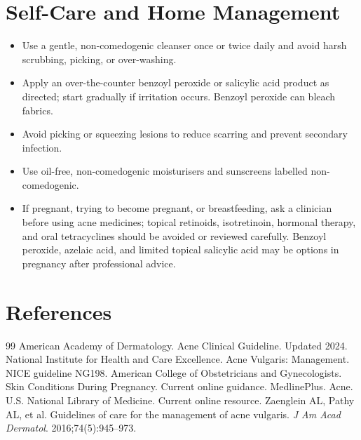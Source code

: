 \section*{Self-Care and Home Management}
\begin{itemize}
 \item Use a gentle, non-comedogenic cleanser once or twice daily and avoid harsh scrubbing, picking, or over-washing.
 \item Apply an over-the-counter benzoyl peroxide or salicylic acid product as directed; start gradually if irritation occurs. Benzoyl peroxide can bleach fabrics.
 \item Avoid picking or squeezing lesions to reduce scarring and prevent secondary infection.
 \item Use oil-free, non-comedogenic moisturisers and sunscreens labelled non-comedogenic.
 \item If pregnant, trying to become pregnant, or breastfeeding, ask a clinician before using acne medicines; topical retinoids, isotretinoin, hormonal therapy, and oral tetracyclines should be avoided or reviewed carefully. Benzoyl peroxide, azelaic acid, and limited topical salicylic acid may be options in pregnancy after professional advice.
\end{itemize}

\section*{References}
\begin{thebibliography}{99}
 American Academy of Dermatology. Acne Clinical Guideline. Updated 2024.
 National Institute for Health and Care Excellence. Acne Vulgaris: Management. NICE guideline NG198.
 American College of Obstetricians and Gynecologists. Skin Conditions During Pregnancy. Current online guidance.
 MedlinePlus. Acne. U.S. National Library of Medicine. Current online resource.
 Zaenglein AL, Pathy AL, et al. Guidelines of care for the management of acne vulgaris. \textit{J Am Acad Dermatol}. 2016;74(5):945--973.
\end{thebibliography}
